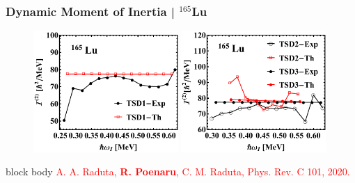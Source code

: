 \documentclass{beamer}
\begin{document}
\begin{frame}
	\frametitle{Dynamic Moment of Inertia | $^{165}$Lu}
	\begin{figure}
		\centering
		\includegraphics[width=0.49\textwidth]{figures/Lu-exp-energies/fig17a_lu165.pdf}
		\includegraphics[width=0.49\textwidth]{figures/Lu-exp-energies/fig17b_lu165.pdf}
	\end{figure}
	\begin{beamercolorbox}[rounded=true,shadow=false, wd=\linewidth,]{block body}
		\centering
		\textcolor{red}{\footnotesize{A. A. Raduta, \textbf{R. Poenaru}, C. M. Raduta, Phys. Rev. C 101, 2020.}}
	\end{beamercolorbox}
\end{frame}
\end{document}
